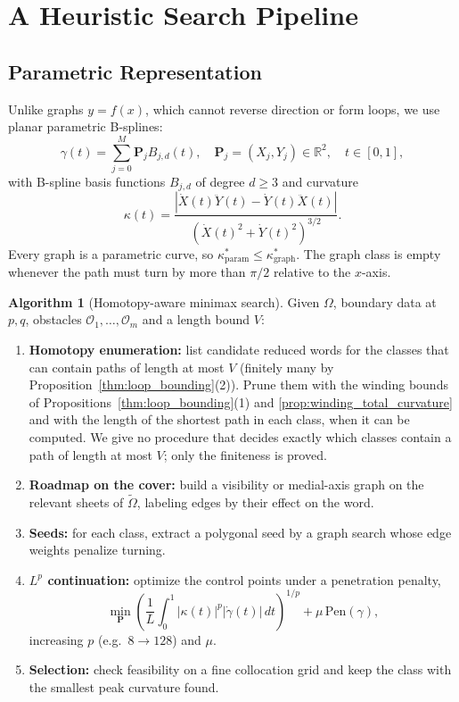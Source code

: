 \documentclass[11pt,reqno]{amsart}
\theoremstyle{definition}
\newtheorem{algorithm}[theorem]{Algorithm}
\providecommand{\R}{\mathbb{R}}
\newcommand{\Cover}{\widetilde{\Omega}}
\numberwithin{equation}{section}
\providecommand{\R}{\mathbb{R}}
\begin{document}
\section{A Heuristic Search Pipeline}

\subsection{Parametric Representation}
Unlike graphs $y = f(x)$, which cannot reverse direction or form loops, we use planar parametric B-splines:
\begin{equation}
\gamma(t) = \sum_{j=0}^{M} \mathbf{P}_j B_{j, d}(t), \quad \mathbf{P}_j = (X_j, Y_j) \in \R^2, \quad t \in [0, 1],
\end{equation}
with B-spline basis functions $B_{j,d}$ of degree $d \ge 3$ and curvature
\begin{equation}
\kappa(t) = \frac{|\dot{X}(t)\ddot{Y}(t) - \dot{Y}(t)\ddot{X}(t)|}{\left(\dot{X}(t)^2 + \dot{Y}(t)^2\right)^{3/2}}.
\end{equation}
Every graph is a parametric curve, so $\kappa^*_{\mathrm{param}} \le \kappa^*_{\mathrm{graph}}$. The graph class is empty whenever the path must turn by more than $\pi/2$ relative to the $x$-axis.

\begin{algorithm}[Homotopy-aware minimax search]
\label{alg:universal_minimax}
Given $\Omega$, boundary data at $p, q$, obstacles $\mathcal{O}_1, \dots, \mathcal{O}_m$ and a length bound $V$:
\begin{enumerate}
    \item \textbf{Homotopy enumeration:} list candidate reduced words for the classes that can contain paths of length at most $V$ (finitely many by Proposition~\ref{thm:loop_bounding}(2)). Prune them with the winding bounds of Propositions~\ref{thm:loop_bounding}(1) and \ref{prop:winding_total_curvature} and with the length of the shortest path in each class, when it can be computed. We give no procedure that decides exactly which classes contain a path of length at most $V$; only the finiteness is proved.
    \item \textbf{Roadmap on the cover:} build a visibility or medial-axis graph on the relevant sheets of $\Cover$, labeling edges by their effect on the word.
    \item \textbf{Seeds:} for each class, extract a polygonal seed by a graph search whose edge weights penalize turning.
    \item \textbf{$L^p$ continuation:} optimize the control points under a penetration penalty,
    \begin{equation}
    \min_{\mathbf{P}} \left( \frac{1}{L} \int_0^1 |\kappa(t)|^p |\dot{\gamma}(t)|\,dt \right)^{1/p} + \mu \, \mathrm{Pen}(\gamma),
    \end{equation}
    increasing $p$ (e.g.\ $8 \to 128$) and $\mu$.
    \item \textbf{Selection:} check feasibility on a fine collocation grid and keep the class with the smallest peak curvature found.
\end{enumerate}
\end{algorithm}
\end{document}
